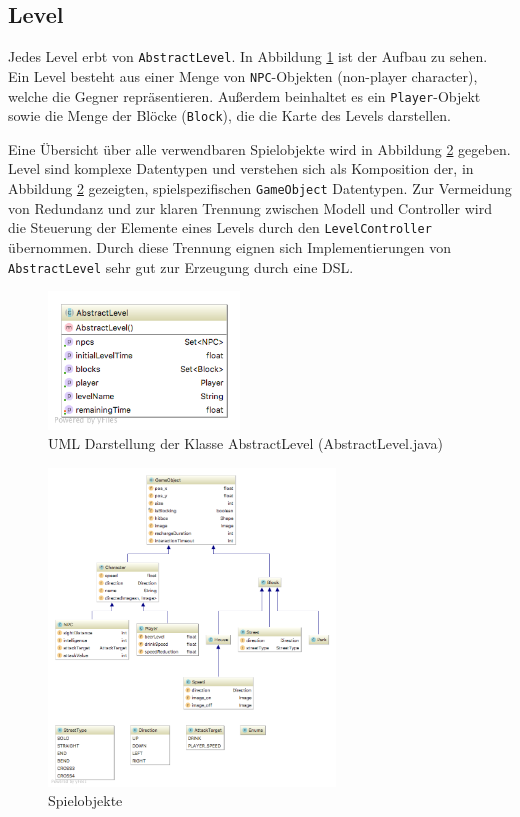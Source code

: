 \subsection{Level}
\label{sub:architektur:level}

Jedes Level erbt von \texttt{AbstractLevel}.
In Abbildung \ref{fig:spielarchitektur:abstractlevel} ist der Aufbau zu sehen.
Ein Level besteht aus einer Menge von \texttt{NPC}-Objekten (non-player character), welche die Gegner repräsentieren.
Außerdem beinhaltet es ein \texttt{Player}-Objekt sowie die Menge der Blöcke (\texttt{Block}), die die Karte des Levels darstellen.

Eine Übersicht über alle verwendbaren Spielobjekte wird in Abbildung \ref{fig:spielarchitektur:model} gegeben.
Level sind komplexe Datentypen und verstehen sich als Komposition der, in Abbildung \ref{fig:spielarchitektur:model} gezeigten, spielspezifischen \texttt{GameObject} Datentypen.
Zur Vermeidung von Redundanz und zur klaren Trennung zwischen Modell und Controller wird die Steuerung der Elemente eines Levels durch den \texttt{LevelController} übernommen.
Durch diese Trennung eignen sich Implementierungen von \texttt{AbstractLevel} sehr gut zur Erzeugung durch eine DSL.

\begin{figure}[]
\centering
\includegraphics[width=2in]{img/05_abstractlevel_uml.png}
\caption{UML Darstellung der Klasse AbstractLevel (AbstractLevel.java)}
\label{fig:spielarchitektur:abstractlevel}
\end{figure}

\begin{figure}[]
\centering
\includegraphics[width=3in]{img/05_model.png}
\caption{Spielobjekte}
\label{fig:spielarchitektur:model}
\end{figure}


